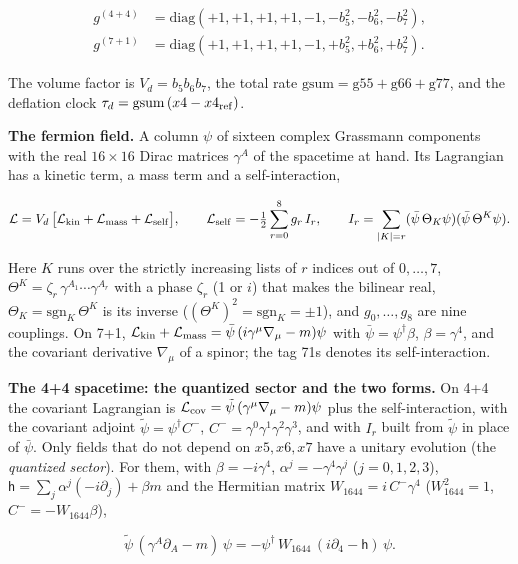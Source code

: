 \documentclass[
  10pt,
]{article}
\begin{document}
\[\begin{aligned}
g^{(4+4)}&=\mathrm{diag}(+1,+1,+1,+1,-1,-b_5^2,-b_6^2,-b_7^2),\\
g^{(7+1)}&=\mathrm{diag}(+1,+1,+1,+1,-1,+b_5^2,+b_6^2,+b_7^2).
\end{aligned}\]

The volume factor is \(V_d=b_5b_6b_7\), the total rate
\(\mathrm{gsum}=\mathrm{g55}+\mathrm{g66}+\mathrm{g77}\), and the
deflation clock \(\tau_d=\mathrm{gsum}\,(x4-x4_{\rm ref})\).

\textbf{The fermion field.} A column \(\psi\) of sixteen complex
Grassmann components with the real \(16\times16\) Dirac matrices
\(\gamma^A\) of the spacetime at hand. Its Lagrangian has a kinetic
term, a mass term and a self-interaction,

\[\mathcal L=V_d\,\big[\mathcal L_{\rm kin}+\mathcal L_{\rm mass}+\mathcal L_{\rm self}\big],
\qquad\mathcal L_{\rm self}=-\tfrac12\sum_{r=0}^{8}g_r\,I_r,\qquad
I_r=\sum_{|K|=r}(\bar\psi\,\Theta_K\psi)(\bar\psi\,\Theta^K\psi).\]

Here \(K\) runs over the strictly increasing lists of \(r\) indices out
of \(0,\dots,7\), \(\Theta^K=\zeta_r\,\gamma^{A_1}\cdots\gamma^{A_r}\)
with a phase \(\zeta_r\) (1 or \(i\)) that makes the bilinear real,
\(\Theta_K=\mathrm{sgn}_K\,\Theta^K\) is its inverse
(\((\Theta^K)^2=\mathrm{sgn}_K=\pm1\)), and \(g_0,\dots,g_8\) are nine
couplings. On 7+1,
\(\mathcal L_{\rm kin}+\mathcal L_{\rm mass}=\bar\psi\,(i\gamma^\mu\nabla_\mu-m)\psi\)
with \(\bar\psi=\psi^\dagger\beta\), \(\beta=\gamma^4\), and the
covariant derivative \(\nabla_\mu\) of a spinor; the tag 71s denotes its
self-interaction.

\textbf{The 4+4 spacetime: the quantized sector and the two forms.} On
4+4 the covariant Lagrangian is
\(\mathcal L_{\rm cov}=\tilde\psi\,(\gamma^\mu\nabla_\mu-m)\psi\) plus
the self-interaction, with the covariant adjoint
\(\tilde\psi=\psi^\dagger C^-\),
\(C^-=\gamma^0\gamma^1\gamma^2\gamma^3\), and with \(I_r\) built from
\(\tilde\psi\) in place of \(\bar\psi\). Only fields that do not depend
on \(x5,x6,x7\) have a unitary evolution (the \emph{quantized sector}).
For them, with \(\beta=-i\gamma^4\), \(\alpha^j=-\gamma^4\gamma^j\)
(\(j=0,1,2,3\)), \(\mathsf h=\sum_j\alpha^j(-i\partial_j)+\beta m\) and
the Hermitian matrix \(W_{1644}=i\,C^-\gamma^4\) (\(W_{1644}^2=1\),
\(C^-=-W_{1644}\beta\)),

\[\tilde\psi\,(\gamma^A\partial_A-m)\,\psi=-\psi^\dagger\,W_{1644}\,(i\partial_4-\mathsf h)\,\psi .\]
\end{document}
